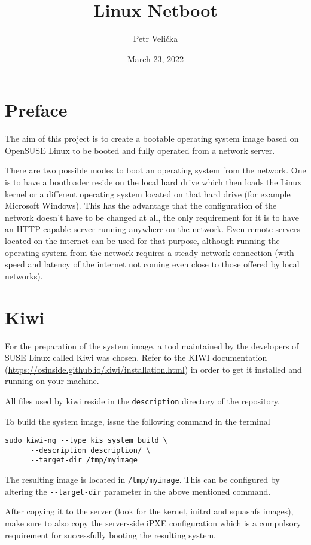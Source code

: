 \documentclass{article}
\title{Linux Netboot}
\date{March 23, 2022}
\author{Petr Velička}
\begin{document}
\maketitle

\section{Preface}

The aim of this project is to create a bootable operating system image based on OpenSUSE Linux to be booted and fully operated from a network server.

There are two possible modes to boot an operating system from the network. One is to have a bootloader reside on the local hard drive which then loads the Linux kernel or a different operating system located on that hard drive (for example Microsoft Windows). This has the advantage that the configuration of the network doesn't have to be changed at all, the only requirement for it is to have an HTTP-capable server running anywhere on the network. Even remote servers located on the internet can be used for that purpose, although running the operating system from the network requires a steady network connection (with speed and latency of the internet not coming even close to those offered by local networks).

\section{Kiwi}

For the preparation of the system image, a tool maintained by the developers of SUSE Linux called Kiwi was chosen. Refer to the KIWI documentation (\url{https://osinside.github.io/kiwi/installation.html}) in order to get it installed and running on your machine.

All files used by kiwi reside in the \verb|description| directory of the repository. 

To build the system image, issue the following command in the terminal

\begin{verbatim}
sudo kiwi-ng --type kis system build \
      --description description/ \
      --target-dir /tmp/myimage
\end{verbatim}

The resulting image is located in \verb|/tmp/myimage|. This can be configured by altering the \verb|--target-dir| parameter in the above mentioned command.

After copying it to the server (look for the kernel, initrd and squashfs images), make sure to also copy the server-side iPXE configuration which is a compulsory requirement for successfully booting the resulting system.
\end{document}

